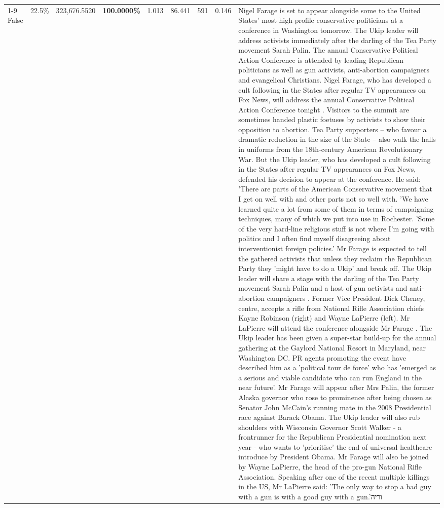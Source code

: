 \begin{table}[H]
\begin{tabular}{lllrlllll}
\cline{1-9} \cline{2-9}
False & 22.5\% & 323,676.5520 & \bfseries \color{red} 100.0000\% & 1.013 & 86.441 & 591 & 0.146 & Nigel Farage is set to appear alongside some to the United States' most high-profile conservative politicians at a conference in Washington tomorrow. The Ukip leader will address activists immediately after the darling of the Tea Party movement Sarah Palin. The annual Conservative Political Action Conference is attended by leading Republican politicians as well as gun activists, anti-abortion campaigners and evangelical Christians. Nigel Farage, who has developed a cult following in the States after regular TV appearances on Fox News, will address the annual Conservative Political Action Conference tonight . Visitors to the summit are sometimes handed plastic foetuses by activists to show their opposition to abortion. Tea Party supporters – who favour a dramatic reduction in the size of the State – also walk the halls in uniforms from the 18th-century American Revolutionary War. But the Ukip leader, who has developed a cult following in the States after regular TV appearances on Fox News, defended his decision to appear at the conference. He said: 'There are parts of the American Conservative movement that I get on well with and other parts not so well with. 'We have learned quite a lot from some of them in terms of campaigning techniques, many of which we put into use in Rochester. 'Some of the very hard-line religious stuff is not where I'm going with politics and I often find myself disagreeing about interventionist foreign policies.' Mr Farage is expected to tell the gathered activists that unless they reclaim the Republican Party they 'might have to do a Ukip' and break off. The Ukip leader will share a stage with the darling of the Tea Party movement Sarah Palin and a host of gun activists and anti-abortion campaigners . Former Vice President Dick Cheney, centre, accepts a rifle from National Rifle Association chiefs Kayne Robinson (right) and Wayne LaPierre (left). Mr LaPierre will attend the conference alongside Mr Farage . The Ukip leader has been given a super-star build-up for the annual gathering at the Gaylord National Resort in Maryland, near Washington DC. PR agents promoting the event have described him as a 'political tour de force' who has 'emerged as a serious and viable candidate who can run England in the near future'. Mr Farage will appear after Mrs Palin, the former Alaska governor who rose to prominence after being chosen as Senator John McCain's running mate in the 2008 Presidential race against Barack Obama. The Ukip leader will also rub shoulders with Wisconsin Governor Scott Walker - a frontrunner for the Republican Presidential nomination next year - who wants to 'prioritise' the end of universal healthcare introduce by President Obama. Mr Farage will also be joined by Wayne LaPierre, the head of the pro-gun National Rifle Association. Speaking after one of the recent multiple killings in the US, Mr LaPierre said: 'The only way to stop a bad guy with a gun is with a good guy with a gun.'וריה \\

\end{tabular}
\end{table}
